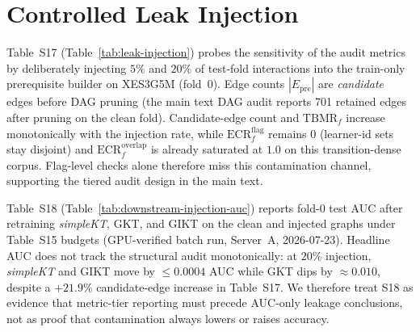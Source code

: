 \documentclass[pdflatex,sn-mathphys-num]{sn-jnl}
\newcommand{\Epre}{\ensuremath{E_{\text{pre}}}}
\begin{document}
\section{Controlled Leak Injection}
\label{sec:supp-leak-injection}
Table~S17 (Table~\ref{tab:leak-injection}) probes the sensitivity of the
audit metrics by deliberately injecting $5\%$ and $20\%$ of test-fold
interactions into the train-only prerequisite builder on XES3G5M (fold~0).
Edge counts $|\Epre|$ are \emph{candidate} edges before DAG pruning (the
main text DAG audit reports 701 retained edges after pruning on the clean
fold). Candidate-edge count and $\mathrm{TBMR}_f$ increase monotonically with the
injection rate, while $\mathrm{ECR}^{\mathrm{flag}}_f$ remains $0$ (learner-id
sets stay disjoint) and $\mathrm{ECR}^{\mathrm{overlap}}_f$ is already
saturated at $1.0$ on this transition-dense corpus. Flag-level checks alone
therefore miss this contamination channel, supporting the tiered audit design
in the main text.
\begin{table}[h!]
\centering
\caption{Controlled Leak Injection, XES3G5M fold~0. $|\Epre|$ counts candidate edges before DAG pruning. (Table S17)}
\label{tab:leak-injection}

\end{table}

Table~S18 (Table~\ref{tab:downstream-injection-auc}) reports fold-0 test AUC
after retraining \textit{simpleKT}, GKT, and GIKT on the clean and injected
graphs under Table~S15 budgets (GPU-verified batch run, Server~A, 2026-07-23).
Headline AUC does not track the structural audit monotonically: at $20\%$
injection, \textit{simpleKT} and GIKT move by ${\leq}0.0004$ AUC while GKT
dips by ${\approx}0.010$, despite a ${+}21.9\%$ candidate-edge increase in
Table~S17. We therefore treat S18 as evidence that metric-tier reporting must
precede AUC-only leakage conclusions, not as proof that contamination always
lowers or raises accuracy.
\begin{table}[h!]
\centering
\caption{Downstream test AUC under controlled leak injection, XES3G5M fold~0 (Table~S18). Models retrained under reduced graph-backbone budgets (Table~S15: 10 epochs, smaller batches); qualitative decoupling (builder mass vs.\ flat AUC) is the intended reading, not cross-table absolute AUC ranking.}
\label{tab:downstream-injection-auc}

\end{table}
\end{document}
